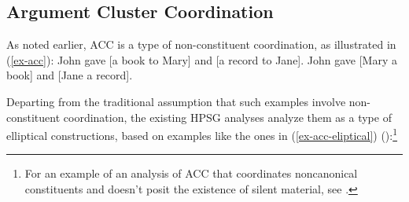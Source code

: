 \documentclass[output=paper
	        ,collection
	        ,collectionchapter
 	        ,biblatex
                ,babelshorthands
                ,newtxmath
                ,draftmode
                ,colorlinks, citecolor=brown
]{langscibook}
\begin{document}
{\iffalse{
To illustrate, an English verb form mismatch is depicted in (\ref{verbform}), from \citep[see][5]{Shiraishi2019}, where the left conjunct requires a participle while the shared material contains an infinitive form of the verb \textit{appear}.

\ea Some new hybrid models already have, and others soon will appear in the automobile industry.\label{verbform}

\citep{Shiraishi2019} capture verb form mismatch of this kind by introducing into their analysis of RNR the feature LID, which carries lexeme identity information. That is, this feature ensures semantic and syntactic category identity but ignores differences introduced by inflectional suffixes, with the result that the participle and the infinitive in (\ref{verbform}) count as lexeme-identical. RNR is licensed by including the LID feature in the MP feature also used in \citet{Chaves2014} (see (\ref{bpd})).
}\fi


\subsection{Argument Cluster Coordination}

As noted earlier, ACC is a type of non-constituent coordination, as
illustrated in (\ref{ex-acc}):
%
%
\eal
\label{ex-acc}
\ex John gave [a book to Mary] and [a record to Jane].   \label{acc-here}
\ex John gave [Mary a book] and [Jane a record].  \label{acc-1} 
\zl
%
%

Departing from the traditional assumption that such examples involve non-constituent
coordination, the existing HPSG analyses analyze them as a type of elliptical constructions,
based on examples like the ones in (\ref{ex-acc-eliptical}) (\citealt{Yatabe2001, Crysmann2003, Beavers2004}):\footnote{For an example of an analysis of ACC that coordinates noncanonical constituents and doesn't posit the existence of silent material, see \citep{Mouret2006}.}

}
\end{document}
